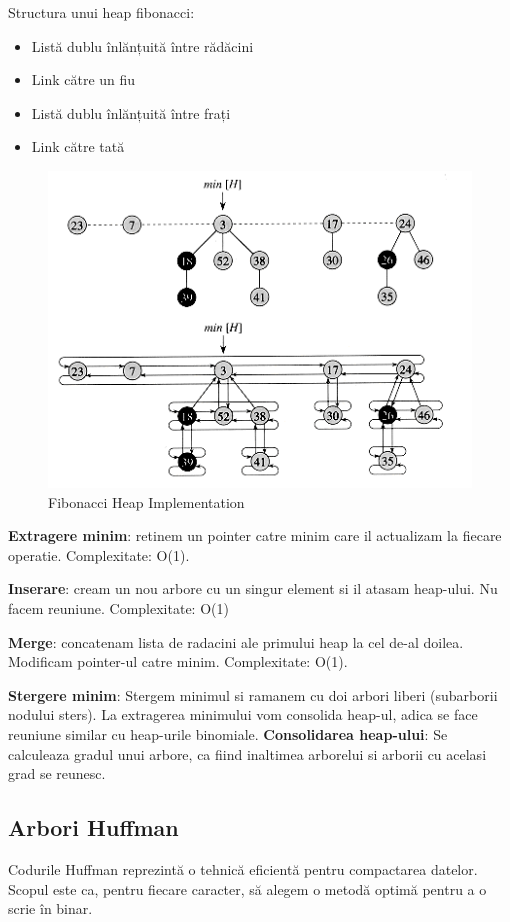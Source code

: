 \documentclass[11pt,a4paper]{article}
\theoremstyle{definition}
\theoremstyle{plain}
\theoremstyle{remark}
\begin{document}
Structura unui heap fibonacci:
\begin{itemize}
    \item Listă dublu înlănțuită între rădăcini
    \item Link către un fiu
    \item Listă dublu înlănțuită între frați
    \item Link către tată
\end{itemize}

\begin{figure}[H]
    \centering
    \includegraphics[width=0.75\linewidth]{fibonacci-heap2.png}
    \caption{Fibonacci Heap Implementation}
    \label{fig:enter-label}
\end{figure}

\textbf{Extragere minim}: retinem un pointer catre minim care il actualizam la fiecare operatie. Complexitate: O(1).

\textbf{Inserare}: cream un nou arbore cu un singur element si il atasam heap-ului. Nu facem reuniune. Complexitate: O(1)

\textbf{Merge}: concatenam lista de radacini ale primului heap la cel de-al doilea. Modificam pointer-ul catre minim. Complexitate: O(1).

\textbf{Stergere minim}: Stergem minimul si ramanem cu doi arbori liberi (subarborii nodului sters). La extragerea minimului vom consolida heap-ul, adica se face reuniune similar cu heap-urile binomiale. \textbf{Consolidarea heap-ului}: Se calculeaza gradul unui arbore, ca fiind inaltimea arborelui si arborii cu acelasi grad se reunesc. 

\subsection{Arbori Huffman}
Codurile Huffman reprezintă o tehnică eficientă pentru compactarea datelor. Scopul este ca, pentru fiecare caracter, să alegem o metodă optimă pentru a o scrie în binar.
\end{document}
